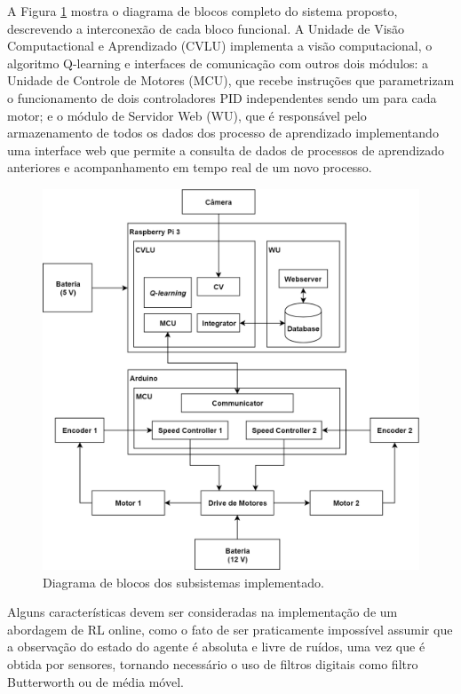\documentclass[a4paper]{ifacconf}
\begin{document}
A Figura \ref{fig:blockDiagramFull} mostra o diagrama de blocos completo do sistema proposto, descrevendo a interconexão de cada bloco funcional. A Unidade de Visão Computactional e Aprendizado (CVLU) implementa a visão computacional, o algoritmo Q-learning e interfaces de comunicação com outros dois módulos: a Unidade de Controle de Motores (MCU), que recebe instruções que parametrizam o funcionamento de dois controladores PID independentes sendo um para cada motor; e o módulo de Servidor Web (WU), que é responsável pelo armazenamento de todos os dados dos processo de aprendizado implementando uma interface web que permite a consulta de dados de processos de aprendizado anteriores e acompanhamento em tempo real de um novo processo.

\begin{figure}
\centering
\includegraphics[scale=0.20]{Figuras/blockDiagramFull.png} 
\caption{Diagrama de blocos dos subsistemas implementado.}
\label{fig:blockDiagramFull}
\end{figure}

Alguns características devem ser consideradas na implementação de um abordagem de RL online, como o fato de ser praticamente impossível assumir que a observação do estado do agente é absoluta e livre de ruídos, uma vez que é obtida por sensores, tornando necessário o uso de filtros digitais como filtro Butterworth ou de média móvel. 
\end{document}
